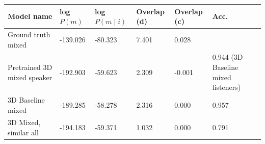\begin{table}[] 
	\begin{tabularx}{\textwidth}{|X|l|l|X|X|X|}
		\hline
		\textbf{Model name}                                    & \textbf{log $P(m)$} & \textbf{log $P(m \mid i)$} & \textbf{Overlap (d)} & \textbf{Overlap (c)} & \textbf{Acc.} \\ \hline
		Ground truth mixed       &     -139.026            &    -80.323             &       7.401        &        0.028        &                         \\ \hline
		Pretrained 3D mixed speaker    &      -192.903           &         -59.623               &        2.309              &      -0.001                & 0.944 (3D Baseline mixed listeners)        \\ \hline
		3D Baseline mixed&      -189.285             &      -58.278                  &             2.316        &         0.000             &                   0.957      \\ \hline
		3D Mixed, similar all&     -194.183        &   -59.371           &    1.032       &   0.000        &        0.791       \\ \hline

\end{tabularx}
\end{table}
